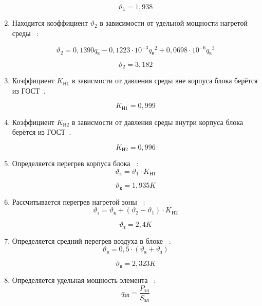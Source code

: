 \begin{enumerate}[label={\arabic*.}]
$$\vartheta_1=1,938$$

\item Находится коэффициент $\vartheta_2$ в зависимости от удельной мощности нагретой среды ~\cite{Rotkop1976}:

\begin{equation}
\vartheta_2 = 0,1390q\mathrm{_к} - 0,1223 \cdot 10^{-3}q\mathrm{_к}^2 + 0,0698 \cdot 10^{-6}q\mathrm{_к}^3
\end{equation}

$$\vartheta_2=3,182$$

\item Коэффициент $K\mathrm{_{Н1}}$ в зависмости от давления
  среды вне корпуса блока берётся из ГОСТ~\cite{GOST_15150-69}.

  $$K\mathrm{_{Н1}} = 0,999$$

  \item Коэффициент $K\mathrm{_{Н2}}$ в зависмости от давления
  среды внутри корпуса блока берётся из ГОСТ~\cite{GOST_15150-69}.

  $$K\mathrm{_{Н2}} = 0,996$$

\item Определяется перегрев корпуса блока ~\cite{Rotkop1976}:
  \begin{equation}
    \vartheta\mathrm{_к} = \vartheta_1 \cdot K\mathrm{_{Н1}}
  \end{equation}
  
  $$\vartheta\mathrm{_к} = 1,935 K$$

\item Рассчитывается перегрев нагретой зоны ~\cite{Rotkop1976}:
    \begin{equation}
    \vartheta\mathrm{_з} = \vartheta\mathrm{_к} + (\vartheta_2 - \vartheta_1) \cdot K\mathrm{_{H2}}
    \end{equation}

    $$\vartheta\mathrm{_з} = 2,4 K$$

  \item Определяется средний перегрев воздуха в блоке ~\cite{Rotkop1976}:
        \begin{equation}
      \vartheta\mathrm{_в} = 0,5 \cdot (\vartheta\mathrm{_к} + \vartheta\mathrm{_з})
    \end{equation}

    $$\vartheta\mathrm{_в} = 2,323 K$$

  \item Определяется удельная мощность элемента ~\cite{Rotkop1976}:
    \begin{equation}
      q\mathrm{_{эл}} = \frac{P\mathrm{_{эл}}}{S\mathrm{_{эл}}}
    \end{equation}


\end{enumerate}
